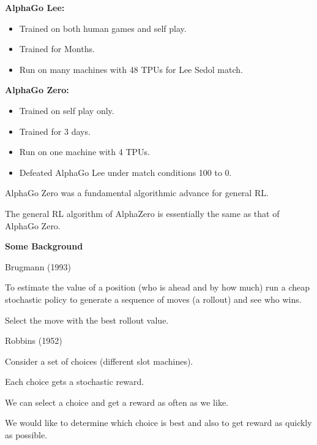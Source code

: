 {

{\bf AlphaGo Lee:}

\begin{itemize}
\item Trained on both human games and self play.
  
\item Trained for Months.

\item Run on many machines with 48 TPUs for Lee Sedol match.
\end{itemize}

{\bf AlphaGo Zero:}
\begin{itemize}
\item Trained on self play only.
  
\item Trained for 3 days.

\item Run on one machine with 4 TPUs.

\item Defeated AlphaGo Lee under match conditions 100 to 0.
\end{itemize}


AlphaGo Zero was a fundamental algorithmic advance for general RL.

\vfill
The general RL algorithm of AlphaZero is essentially the same as that of AlphaGo Zero.

\slide{}

\centerline{\bf Some Background}

\vfill

{Brugmann (1993)}

To estimate the value of a position (who is ahead and by how much)
run a cheap stochastic policy to generate a sequence of moves (a rollout) and see who wins.

\vfill
Select the move with the best rollout value.

{Robbins (1952)}

Consider a set of choices (different slot machines).

Each choice gets a stochastic reward.

\vfill
We can select a choice and get a reward as often as we like.

\vfill
We would like to determine which choice is best and also to get reward as quickly as possible.

}
